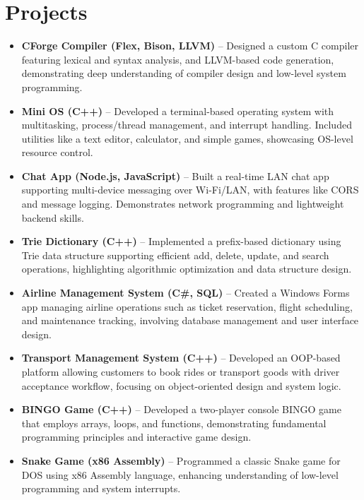 \documentclass[a4paper,9.5pt]{article}
\begin{document}
\section*{Projects}
\begin{itemize}
    \item \textbf{CForge Compiler (Flex, Bison, LLVM)} – Designed a custom C compiler featuring lexical and syntax analysis, and LLVM-based code generation, demonstrating deep understanding of compiler design and low-level system programming.

    \item \textbf{Mini OS (C++)} – Developed a terminal-based operating system with multitasking, process/thread management, and interrupt handling. Included utilities like a text editor, calculator, and simple games, showcasing OS-level resource control.

    \item \textbf{Chat App (Node.js, JavaScript)} – Built a real-time LAN chat app supporting multi-device messaging over Wi-Fi/LAN, with features like CORS and message logging. Demonstrates network programming and lightweight backend skills.

    \item \textbf{Trie Dictionary (C++)} – Implemented a prefix-based dictionary using Trie data structure supporting efficient add, delete, update, and search operations, highlighting algorithmic optimization and data structure design.

    \item \textbf{Airline Management System (C\#, SQL)} – Created a Windows Forms app managing airline operations such as ticket reservation, flight scheduling, and maintenance tracking, involving database management and user interface design.

    \item \textbf{Transport Management System (C++)} – Developed an OOP-based platform allowing customers to book rides or transport goods with driver acceptance workflow, focusing on object-oriented design and system logic.

    \item \textbf{BINGO Game (C++)} – Developed a two-player console BINGO game that employs arrays, loops, and functions, demonstrating fundamental programming principles and interactive game design.

    \item \textbf{Snake Game (x86 Assembly)} – Programmed a classic Snake game for DOS using x86 Assembly language, enhancing understanding of low-level programming and system interrupts.
\end{itemize}
\end{document}
